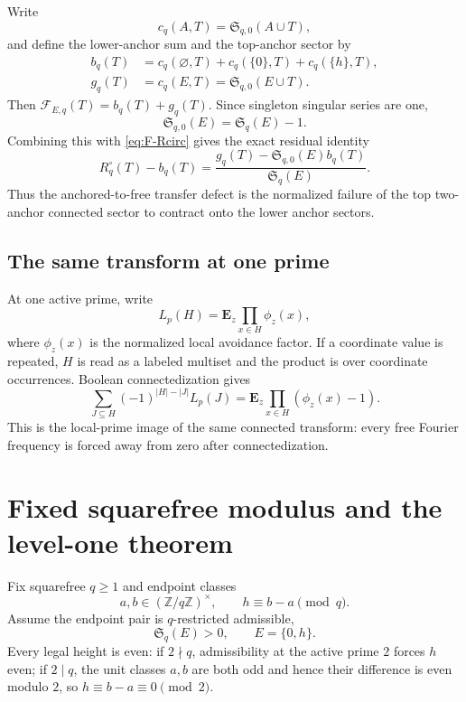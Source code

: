\documentclass[11pt]{article}
\theoremstyle{definition}
\theoremstyle{remark}
\newcommand{\SSer}{\mathfrak S}
\newcommand{\1}{\mathbf 1}
\newcommand{\Fcal}{\mathcal F}
\newcommand{\Zmod}{\mathbb Z}
\begin{document}
Write
\[
c_q(A,T)=\SSer_{q,0}(A\cup T),
\]
and define the lower-anchor sum and the top-anchor sector by
\begin{align}
b_q(T)&=c_q(\varnothing,T)+c_q(\{0\},T)+c_q(\{h\},T),\label{eq:bq}\\
g_q(T)&=c_q(E,T)=\SSer_{q,0}(E\cup T).\label{eq:gq}
\end{align}
Then $\Fcal_{E,q}(T)=b_q(T)+g_q(T)$.  Since singleton singular series are one,
\[
\SSer_{q,0}(E)=\SSer_q(E)-1.
\]
Combining this with \eqref{eq:F-Rcirc} gives the exact residual identity
\begin{equation}\label{eq:anchor-residual}
\boxed{
R_q^\circ(T)-b_q(T)
=\frac{g_q(T)-\SSer_{q,0}(E)b_q(T)}{\SSer_q(E)}.
}
\end{equation}
Thus the anchored-to-free transfer defect is the normalized failure of the top two-anchor connected sector to contract onto the lower anchor sectors.

\subsection{The same transform at one prime}

At one active prime, write
\[
L_p(H)=\mathbf E_z\prod_{x\in H}\phi_z(x),
\]
where $\phi_z(x)$ is the normalized local avoidance factor.  If a coordinate value is repeated, $H$ is read as a labeled multiset and the product is over coordinate occurrences.  Boolean connectedization gives
\begin{equation}\label{eq:local-connected}
\sum_{J\subseteq H}(-1)^{|H|-|J|}L_p(J)
=\mathbf E_z\prod_{x\in H}(\phi_z(x)-1).
\end{equation}
This is the local-prime image of the same connected transform: every free Fourier frequency is forced away from zero after connectedization.

\section{Fixed squarefree modulus and the level-one theorem}\label{sec:fixed-q-setup}

Fix squarefree $q\ge1$ and endpoint classes
\[
a,b\in(\Zmod/q\Zmod)^\times,
\qquad h\equiv b-a\pmod q.
\]
Assume the endpoint pair is $q$-restricted admissible,
\[
\SSer_q(E)>0,
\qquad E=\{0,h\}.
\]
Every legal height is even: if $2\nmid q$, admissibility at the active prime $2$ forces $h$ even; if $2\mid q$, the unit classes $a,b$ are both odd and hence their difference is even modulo $2$, so $h\equiv b-a\equiv0\pmod2$.
\end{document}
